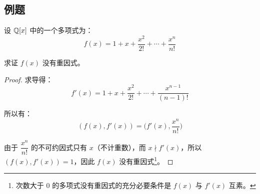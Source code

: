 \subsection{例题}

\begin{exercise}
	设 $\mathbb Q[x]$ 中的一个多项式为：
	$$
	f(x) = 1 + x + \dfrac{x^2}{2!} + \cdots + \dfrac{x^n}{n!}
	$$

	求证 $f(x)$ 没有重因式。
\end{exercise}

\begin{proof}
	求导得：
	$$
	f'(x) = 1 + x + \dfrac{x^2}{2!} + \cdots + \dfrac{x^{n - 1}}{(n - 1)!}
	$$

	所以有：
	$$
	(f(x), f'(x)) = \biggl( f'(x), \dfrac{x^n}{n!} \biggr)
	$$

	由于 $\dfrac{x^n}{n!}$ 的不可约因式只有 $x$（不计重数），而 $x \nmid f'(x)$，所以 $(f(x), f'(x)) = 1$，因此 $f(x)$ 没有重因式\footnote{次数大于 $0$ 的多项式没有重因式的充分必要条件是 $f(x)$ 与 $f'(x)$ 互素。}。
\end{proof}